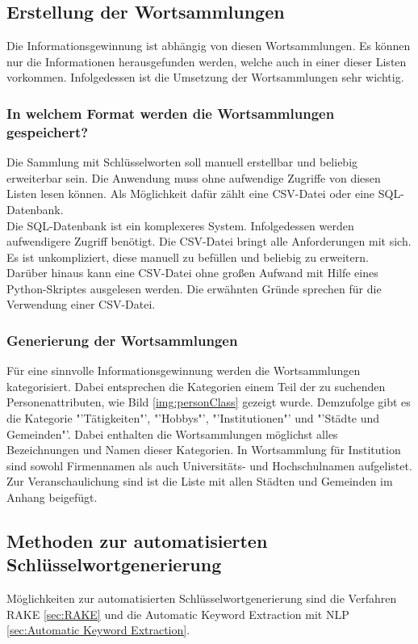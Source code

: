 	\subsection{Erstellung der Wortsammlungen}
	Die Informationsgewinnung ist abhängig von diesen Wortsammlungen. Es können nur die Informationen herausgefunden werden, welche auch in einer dieser Listen vorkommen. Infolgedessen ist die Umsetzung der Wortsammlungen sehr wichtig.
	
		\subsubsection{In welchem Format werden die Wortsammlungen gespeichert?}
		Die Sammlung mit Schlüsselworten soll manuell erstellbar und beliebig erweiterbar sein. Die Anwendung muss ohne aufwendige Zugriffe von diesen Listen lesen können. Als Möglichkeit dafür zählt eine CSV-Datei oder eine SQL-Datenbank.\\
		Die SQL-Datenbank ist ein komplexeres System. Infolgedessen werden aufwendigere Zugriff benötigt. Die CSV-Datei bringt alle Anforderungen mit sich. Es ist unkompliziert, diese manuell zu befüllen und beliebig zu erweitern. Darüber hinaus kann eine CSV-Datei ohne großen Aufwand mit Hilfe eines Python-Skriptes ausgelesen werden. Die erwähnten Gründe sprechen für die Verwendung einer CSV-Datei.
		\subsubsection{Generierung der Wortsammlungen}	
		Für eine sinnvolle Informationsgewinnung werden die Wortsammlungen kategorisiert. Dabei entsprechen die Kategorien einem Teil der zu suchenden Personenattributen, wie Bild \ref{img:personClass} gezeigt wurde. Demzufolge gibt es die Kategorie "'Tätigkeiten"', "'Hobbys"', "'Institutionen"' und "'Städte und Gemeinden"'. Dabei enthalten die Wortsammlungen möglichst alles Bezeichnungen und Namen dieser Kategorien. 
		In Wortsammlung für Institution sind sowohl Firmennamen als auch Universitäts- und Hochschulnamen aufgelistet. Zur Veranschaulichung sind ist die Liste mit allen Städten und Gemeinden im Anhang beigefügt. %
	\subsection{Methoden zur automatisierten Schlüsselwortgenerierung}
	Möglichkeiten zur automatisierten Schlüsselwortgenerierung sind die Verfahren RAKE \ref{sec:RAKE} und die Automatic Keyword Extraction mit NLP \ref{sec:Automatic Keyword Extraction}.
